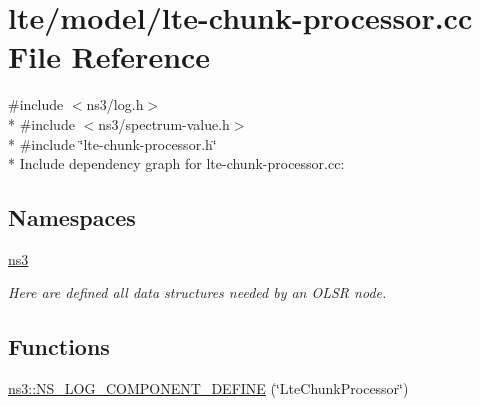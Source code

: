 \hypertarget{lte-chunk-processor_8cc}{}\section{lte/model/lte-\/chunk-\/processor.cc File Reference}
\label{lte-chunk-processor_8cc}
{\ttfamily \#include $<$ns3/log.\+h$>$}\\*
{\ttfamily \#include $<$ns3/spectrum-\/value.\+h$>$}\\*
{\ttfamily \#include \char`\"{}lte-\/chunk-\/processor.\+h\char`\"{}}\\*
Include dependency graph for lte-\/chunk-\/processor.cc\+:
\subsection*{Namespaces}
\begin{DoxyCompactItemize}
\item 
 \hyperlink{namespacens3}{ns3}
\begin{DoxyCompactList}\small\item\em Here are defined all data structures needed by an O\+L\+SR node. \end{DoxyCompactList}\end{DoxyCompactItemize}
\subsection*{Functions}
\begin{DoxyCompactItemize}
\item 
\hyperlink{namespacens3_a8e5f4464f5445399c1c66e2a746f7d67}{ns3\+::\+N\+S\+\_\+\+L\+O\+G\+\_\+\+C\+O\+M\+P\+O\+N\+E\+N\+T\+\_\+\+D\+E\+F\+I\+NE} (\char`\"{}Lte\+Chunk\+Processor\char`\"{})
\end{DoxyCompactItemize}
